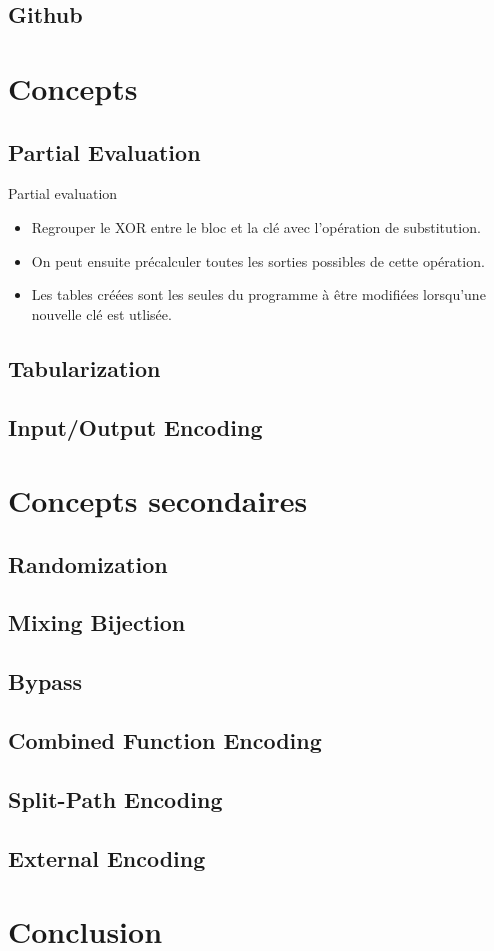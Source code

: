 \documentclass{beamer}
\begin{document}
\subsection{Github}

\section{Concepts}

\subsection{Partial Evaluation}
\begin{frame}{Partial evaluation}
\begin{itemize}
\item Regrouper le XOR entre le bloc et la clé avec l'opération de substitution.
\item On peut ensuite précalculer toutes les sorties possibles de cette opération.
\item Les tables créées sont les seules du programme à être modifiées lorsqu'une nouvelle clé est utlisée.
\end{itemize}
\end{frame}


\subsection{Tabularization}

\subsection{Input/Output Encoding}

\section{Concepts secondaires}

\subsection{Randomization}

\subsection{Mixing Bijection}

\subsection{Bypass}

\subsection{Combined Function Encoding}

\subsection{Split-Path Encoding}

\subsection{External Encoding}

\section{Conclusion}
\end{document}
